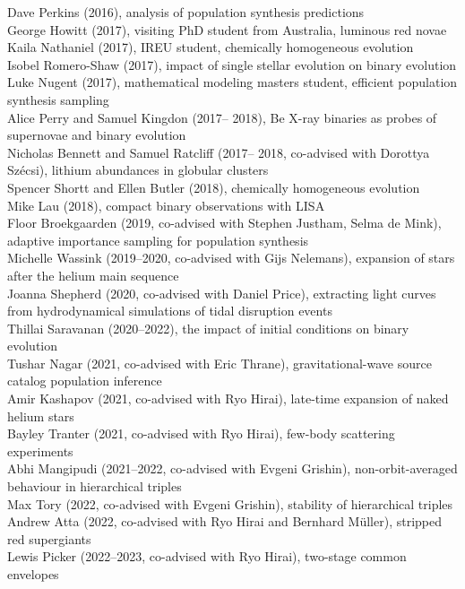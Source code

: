 \documentclass[margin,line]{res}
\begin{document}
\begin{resume}
Dave Perkins (2016), analysis of population synthesis predictions\\
George Howitt (2017), visiting PhD student from Australia, luminous red novae\\
Kaila Nathaniel (2017), IREU student, chemically homogeneous evolution\\
Isobel Romero-Shaw (2017), impact of single stellar evolution on binary evolution\\
Luke Nugent (2017), mathematical modeling masters student, efficient population synthesis sampling\\
Alice Perry and Samuel Kingdon (2017-- 2018), Be X-ray binaries as probes of supernovae and binary evolution\\
Nicholas Bennett and Samuel Ratcliff (2017-- 2018, co-advised with Dorottya Sz\'{e}csi), lithium abundances in globular clusters\\ 
Spencer Shortt and Ellen Butler (2018), chemically homogeneous evolution\\
Mike Lau (2018), compact binary observations with LISA\\
Floor Broekgaarden (2019, co-advised with Stephen Justham, Selma de Mink), adaptive importance sampling for population synthesis\\
Michelle Wassink (2019--2020, co-advised with Gijs Nelemans), expansion of stars after the helium main sequence\\
Joanna Shepherd (2020, co-advised with Daniel Price), extracting light curves from hydrodynamical simulations of tidal disruption events\\
Thillai Saravanan (2020--2022), the impact of initial conditions on binary evolution\\
Tushar Nagar (2021, co-advised with Eric Thrane), gravitational-wave source catalog population inference\\
Amir Kashapov (2021, co-advised with Ryo Hirai), late-time expansion of naked helium stars\\
Bayley Tranter (2021, co-advised with Ryo Hirai), few-body scattering experiments\\
Abhi Mangipudi (2021--2022, co-advised with Evgeni Grishin), non-orbit-averaged behaviour in hierarchical triples\\ 
Max Tory (2022, co-advised with Evgeni Grishin), stability of hierarchical triples\\
Andrew Atta (2022, co-advised with Ryo Hirai and Bernhard M\"{u}ller), stripped red supergiants\\
Lewis Picker (2022--2023, co-advised with Ryo Hirai), two-stage common envelopes\\

\end{resume}
\end{document}

